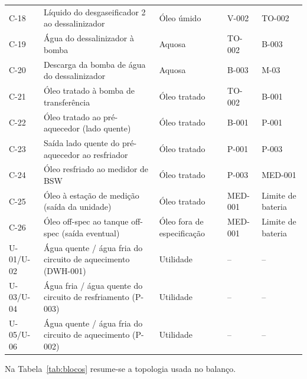 \documentclass[11pt,a4paper]{article}
\numberwithin{equation}{section}
\numberwithin{table}{section}
\numberwithin{figure}{section}
\begin{document}
\begin{longtable}{lL{5.6cm}L{2.8cm}L{1.9cm}L{2.5cm}}
C-18 & Líquido do desgaseificador 2 ao dessalinizador & Óleo úmido & V-002 & TO-002\\
C-19 & Água do dessalinizador à bomba & Aquosa & TO-002 & B-003\\
C-20 & Descarga da bomba de água do dessalinizador & Aquosa & B-003 & M-03\\
C-21 & Óleo tratado à bomba de transferência & Óleo tratado & TO-002 & B-001\\
C-22 & Óleo tratado ao pré-aquecedor (lado quente) & Óleo tratado & B-001 & P-001\\
C-23 & Saída lado quente do pré-aquecedor ao resfriador & Óleo tratado & P-001 & P-003\\
C-24 & Óleo resfriado ao medidor de BSW & Óleo tratado & P-003 & MED-001\\
C-25 & Óleo à estação de medição (saída da unidade) & Óleo tratado & MED-001 & Limite de bateria\\
C-26 & Óleo off-spec ao tanque off-spec (saída eventual) & Óleo fora de especificação & MED-001 & Limite de bateria\\
\midrule
U-01/U-02 & Água quente / água fria do circuito de aquecimento (DWH-001) & Utilidade & -- & --\\
U-03/U-04 & Água fria / água quente do circuito de resfriamento (P-003) & Utilidade & -- & --\\
U-05/U-06 & Água quente / água fria do circuito de aquecimento (P-002) & Utilidade & -- & --\\
\bottomrule\end{longtable}
Na Tabela~\ref{tab:blocos} resume-se a topologia usada no balanço.
\end{document}
